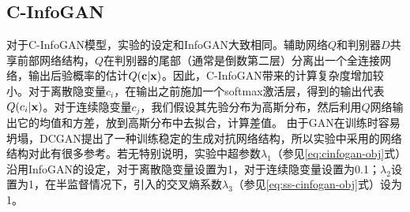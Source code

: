 \subsection{C-InfoGAN}
对于C-InfoGAN模型，实验的设定和InfoGAN大致相同。辅助网络$Q$和判别器$D$共享前部网络结构，$Q$在判别器的尾部（通常是倒数第二层）分离出一个全连接网络，输出后验概率的估计$Q(\mathbf{c}|\mathbf{x})$。因此，C-InfoGAN带来的计算复杂度增加较小。对于离散隐变量$c_i$，在输出之前施加一个softmax激活层，得到的输出代表$Q(c_i|\mathbf{x})$。对于连续隐变量$c_j$，我们假设其先验分布为高斯分布，然后利用$Q$网络输出它的均值和方差，放到高斯分布中去拟合，计算差值。
由于GAN在训练时容易坍塌，DCGAN\citep{radford2015unsupervised}提出了一种训练稳定的生成对抗网络结构，所以实验中采用的网络结构对此有很多参考。若无特别说明，实验中超参数$\lambda_1$（参见\eqref{eq:cinfogan-obj}式）沿用InfoGAN的设定，对于离散隐变量设置为1，对于连续隐变量设置为0.1；$\lambda_2$设置为1，在半监督情况下，引入的交叉熵系数$\lambda_3$（参见\eqref{eq:ss-cinfogan-obj}式）设为1。

